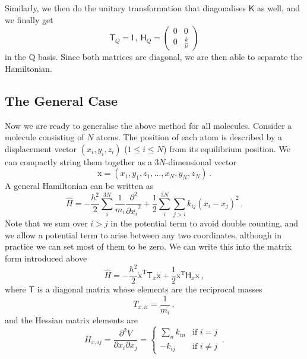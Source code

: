 \documentclass{article}
\theoremstyle{plain}\theoremheaderfont{\normalfont\itshape}\theorembodyfont{\rmfamily}\theoremseparator{.}\newtheorem*{rem}{Remark}\newtheorem*{ex}{Example}\newtheorem*{proof}{Proof}\newtheorem*{altp}{Alternative proof}
\theoremstyle{plain}\theoremheaderfont{\normalfont\bfseries}\theorembodyfont{\rmfamily}\theoremseparator{.}\newtheorem{thm}{Theorem}[section]\newtheorem{lem}[thm]{Lemma}\newtheorem{prop}[thm]{Proposition}\newtheorem*{cor}{Corollary}\newtheorem{defn}[thm]{Definition}\newtheorem{clm}[thm]{Claim}\newtheorem{clminproof}{Claim}
\theoremstyle{break}\theoremheaderfont{\normalfont\itshape}\theorembodyfont{\rmfamily}\theoremseparator{.\medskip}\newtheorem*{proofskip}{Proof}\newtheorem*{exs}{Examples}\newtheorem*{rems}{Remarks}
\theoremstyle{break}\theoremheaderfont{\normalfont\bfseries}\theorembodyfont{\rmfamily}\theoremseparator{.\medskip}\newtheorem{lemskip}[thm]{Lemma}\newtheorem{defnskip}[thm]{Definition}\newtheorem{propskip}[thm]{Proposition}\newtheorem{thmskip}[thm]{Theorem}
\numberwithin{equation}{section}
\newcommand{\tp}{^\mathrm{T}}
\newcommand{\pdv}[3][]{\frac{\partial^{#1} #2}{{\partial #3}^{#1}}}
\newcommand{\vb}[1]{\bm{\mathrm{#1}}}
\begin{document}
    Similarly, we then do the unitary transformation that diagonalises \(\mathsf{K}\) as well, and we finally get
    \begin{equation}
        \mathsf{T}_Q=\mathsf{I}\,,\ \mathsf{H}_Q=\begin{pmatrix}
            0 & 0 \\ 0 & \frac{k}{\mu}
        \end{pmatrix}
    \end{equation}
    in the \(\vb{Q}\) basis. Since both matrices are diagonal, we are then able to separate the Hamiltonian.

    \subsection{The General Case}
    Now we are ready to generalise the above method for all molecules. Consider a molecule consisting of \(N\) atoms. The position of each atom is described by a displacement vector \((x_i,y_i,z_i)\) (\(1\le i\le N\)) from its equilibrium position. We can compactly string them together as a \(3N\)-dimensional vector
    \begin{equation}
        \vb{x}=(x_1,y_1,z_1,\dots,x_N,y_N,z_N)\,.
    \end{equation}
    A general Hamiltonian can be written as
    \begin{equation}
        \hat{H}=-\frac{\hbar^2}{2}\sum_i^{3N}\frac{1}{m_i}\pdv[2]{}{x_i}+\frac{1}{2}\sum_i^{3N}\sum_{j>i}k_{ij}(x_i-x_j)^2\,.
    \end{equation}
    Note that we sum over \(i>j\) in the potential term to avoid double counting, and we allow a potential term to arise between any two coordinates, although in practice we can set most of them to be zero. We can write this into the matrix form introduced above
    \begin{equation}
        \hat{H}=-\frac{\hbar^2}{2}\vb{\dot{x}}\tp\mathsf{T}_x\vb{\dot{x}}+\frac{1}{2}\vb{x}\tp\mathsf{H}_x\vb{x}\,,
    \end{equation}
    where \(\mathsf{T}\) is a diagonal matrix whose elements are the reciprocal masses
    \begin{equation}
        T_{x,ii}=\frac{1}{m_i}\,,
    \end{equation}
    and the Hessian matrix elements are
    \begin{equation}
        H_{x,ij}=\frac{\partial^2 V}{\partial x_i\partial x_j}=\begin{cases}
            \sum_n k_{in} & \text{if }i=j \\
            -k_{ij} & \text{if }i\ne j
        \end{cases}\,.
    \end{equation}
\end{document}
